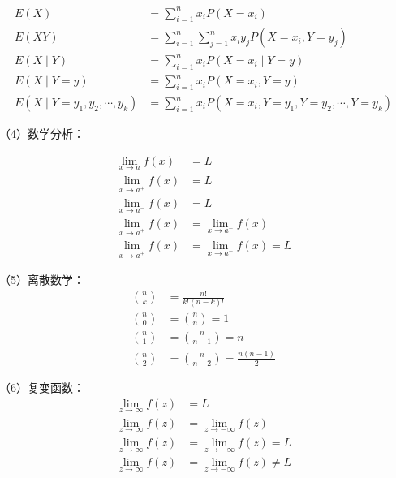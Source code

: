 \begin{ujnbody}
    \begin{equation}
        \begin{split}
            E(X) &= \sum_{i=1}^n x_iP(X=x_i) \\
            E(XY) &= \sum_{i=1}^n \sum_{j=1}^n x_iy_jP(X=x_i,Y=y_j) \\
            E(X \mid Y) &= \sum_{i=1}^n x_iP(X=x_i \mid Y=y) \\
            E(X \mid Y=y) &= \sum_{i=1}^n x_iP(X=x_i,Y=y) \\
            E(X \mid Y=y_1,y_2,\cdots,y_k) &= \sum_{i=1}^n x_iP(X=x_i,Y=y_1,Y=y_2,\cdots,Y=y_k)
        \end{split}
    \end{equation}

    （4）数学分析：

    \begin{equation}
        \begin{split}
            \lim_{x \to a}f(x) &= L \\
            \lim_{x \to a^+}f(x) &= L \\
            \lim_{x \to a^-}f(x) &= L \\
            \lim_{x \to a^+}f(x) &= \lim_{x \to a^-}f(x) \\
            \lim_{x \to a^+}f(x) &= \lim_{x \to a^-}f(x) = L
        \end{split}
    \end{equation}

    （5）离散数学：
    \begin{equation}
        \begin{split}
            \binom{n}{k} &= \frac{n!}{k!(n-k)!} \\
            \binom{n}{0} &= \binom{n}{n} = 1 \\
            \binom{n}{1} &= \binom{n}{n-1} = n \\
            \binom{n}{2} &= \binom{n}{n-2} = \frac{n(n-1)}{2}
        \end{split}
    \end{equation}

    （6）复变函数：
    \begin{equation}
        \begin{split}
            \lim_{z \to \infty}f(z) &= L \\
            \lim_{z \to \infty}f(z) &= \lim_{z \to -\infty}f(z) \\
            \lim_{z \to \infty}f(z) &= \lim_{z \to -\infty}f(z) = L \\
            \lim_{z \to \infty}f(z) &= \lim_{z \to -\infty}f(z) \neq L
        \end{split}
    \end{equation}

\end{ujnbody}
